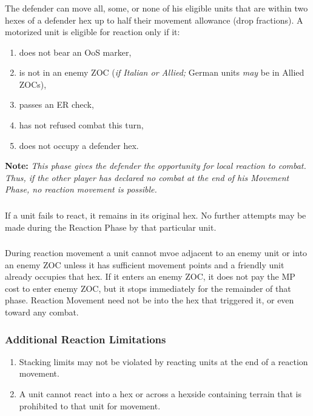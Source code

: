 \subsubsection{}
The defender can move all, some, or none of his eligible units that are within two hexes of a defender hex up to half their movement allowance (drop fractions). A motorized unit is eligible for reaction only if it:
\begin{enumerate}[label=\alph*.]
    \item does not bear an OoS marker,
    \item is not in an enemy ZOC (\textit{if Italian or Allied;} German units \textit{may} be in Allied ZOCs),
    \item passes an ER check,
    \item has not refused combat this turn,
    \item does not occupy a defender hex.
\end{enumerate}

\textbf{Note:} \textit{This phase gives the defender the opportunity for local reaction to combat. Thus, if the other player has declared no combat at the end of his Movement Phase, no reaction movement is possible.}

\subsubsection{}
If a unit fails to react, it remains in its original hex. No further attempts may be made during the Reaction Phase by that particular unit.

\subsubsection{}
During reaction movement a unit cannot mvoe adjacent to an enemy unit or into an enemy ZOC unless it has sufficient movement points and a friendly unit already occupies that hex. If it enters an enemy ZOC, it does not pay the MP cost to enter enemy ZOC, but it stops immediately for the remainder of that phase. Reaction Movement need not be into the hex that triggered it, or even toward any combat.

\subsubsection{\textbf{Additional Reaction Limitations}}
\begin{enumerate}[label=\alph*.]
    \item Stacking limits may not be violated by reacting units at the end of a reaction movement.
    \item A unit cannot react into a hex or across a hexside containing terrain that is prohibited to that unit for movement.
\end{enumerate}